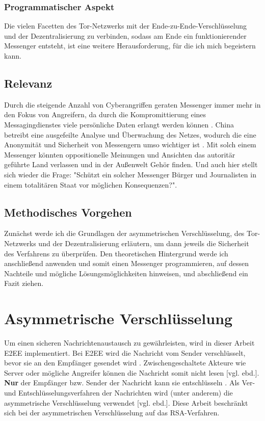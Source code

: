 \documentclass[a4paper,ngerman, headheight=28pt,12pt]{scrartcl}
\newcommand{\vcite}[1]{\cite[vgl.][]{#1}}
\newcommand{\vebd}{[vgl. ebd.]}
\begin{document}
\subsubsection{Programmatischer Aspekt}
Die vielen Facetten des Tor-Netzwerks mit der Ende-zu-Ende-Verschlüsselung und der Dezentralisierung zu verbinden, sodass am Ende ein funktionierender Messenger entsteht, ist eine weitere Herausforderung, für die ich mich begeistern kann.

\subsection{Relevanz}
Durch die steigende Anzahl von Cyberangriffen geraten  Messenger immer mehr in den Fokus von Angreifern, da durch die Kompromittierung eines Messagingdienstes viele persönliche Daten erlangt werden können \vcite{Cyberattacks}. China betreibt eine ausgefeilte Analyse und Überwachung des Netzes, wodurch die eine Anonymität und Sicherheit von Messengern umso wichtiger ist \vcite{GreatFirewallChina}. Mit solch einem Messenger könnten oppositionelle Meinungen und Ansichten das autoritär geführte Land verlassen und in der Außenwelt Gehör finden. Und auch hier stellt sich wieder die Frage: "Schützt ein solcher Messenger Bürger und Journalisten in einem totalitären Staat vor möglichen Konsequenzen?".

\subsection{Methodisches Vorgehen}
Zunächst werde ich die Grundlagen der asymmetrischen Verschlüsselung, des Tor-Netzwerks und der Dezentralisierung erläutern, um dann jeweils die Sicherheit des Verfahrens zu überprüfen. Den theoretischen Hintergrund werde ich anschließend anwenden und somit einen Messenger programmieren, auf dessen Nachteile und mögliche Lösungsmöglichkeiten hinweisen, und abschließend ein Fazit ziehen.

\section{Asymmetrische Verschlüsselung}
Um einen sicheren Nachrichtenaustausch zu gewährleisten, wird in dieser Arbeit E2EE implementiert. Bei E2EE wird die Nachricht vom Sender verschlüsselt, bevor sie an den Empfänger gesendet wird \vcite{E2EE}. Zwischengeschaltete Akteure wie Server oder mögliche Angreifer können die Nachricht somit nicht lesen \vebd. \textbf{Nur} der Empfänger bzw. Sender der Nachricht kann sie entschlüsseln \vcite{E2EE-Method}. Als Ver- und Entschlüsselungsverfahren der Nachrichten wird (unter anderem) die asymmetrische Verschlüsselung verwendet \vebd. Diese Arbeit beschränkt sich bei der asymmetrischen Verschlüsselung auf das RSA-Verfahren.
\end{document}

